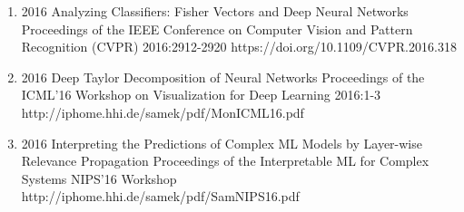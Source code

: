 {\begin{enumerate}
        \item {}
                                {2016}
                                {Analyzing Classifiers: Fisher Vectors and Deep Neural Networks}
                                {Proceedings of the IEEE Conference on Computer Vision and Pattern Recognition (CVPR)}
                                {2016:2912-2920}
                                {https://doi.org/10.1109/CVPR.2016.318}

        \item {}
                                {2016}
                                {Deep Taylor Decomposition of Neural Networks}
                                {Proceedings of the ICML'16 Workshop on Visualization for Deep Learning}
                                {2016:1-3}
                                {http://iphome.hhi.de/samek/pdf/MonICML16.pdf}

        \item {}
                                {2016}
                                {Interpreting the Predictions of Complex ML Models by Layer-wise Relevance Propagation}
                                {Proceedings of the Interpretable ML for Complex Systems NIPS'16 Workshop}
                                {}
                                {http://iphome.hhi.de/samek/pdf/SamNIPS16.pdf}

    \end{enumerate}
}
